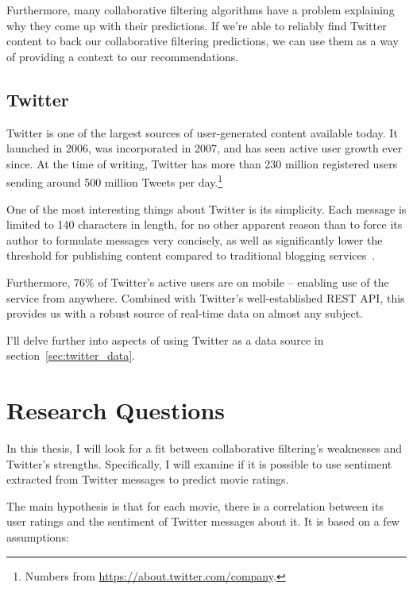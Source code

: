 Furthermore, many collaborative filtering algorithms have a problem explaining why they come up with their predictions. If we're able to reliably find Twitter content to back our collaborative filtering predictions, we can use them as a way of providing a context to our recommendations.

\subsection{Twitter}

Twitter is one of the largest sources of user-generated content available today. It launched in 2006, was incorporated in 2007, and has seen active user growth ever since. At the time of writing, Twitter has more than 230 million registered users sending around 500 million Tweets per day.\footnote{Numbers from \url{https://about.twitter.com/company}.}

One of the most interesting things about Twitter is its simplicity. Each message is limited to 140 characters in length, for no other apparent reason than to force its author to formulate messages very concisely, as well as significantly lower the threshold for publishing content compared to traditional blogging services~\cite{Java:2007:WWT:1348549.1348556}.

Furthermore, 76\% of Twitter's active users are on mobile -- enabling use of the service from anywhere. Combined with Twitter's well-established REST API, this provides us with a robust source of real-time data on almost any subject.

I'll delve further into aspects of using Twitter as a data source in section~\ref{sec:twitter_data}.

\section{Research Questions}

In this thesis, I will look for a fit between collaborative filtering's weaknesses and Twitter's strengths. Specifically, I will examine if it is possible to use sentiment extracted from Twitter messages to predict movie ratings.

The main hypothesis is that for each movie, there is a correlation between its user ratings and the sentiment of Twitter messages about it. It is based on a few assumptions:

